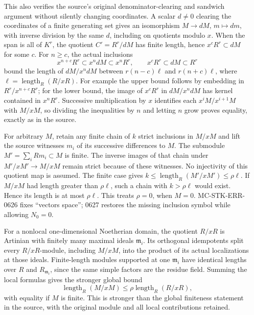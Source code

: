 This also verifies the source's original denominator-clearing and sandwich argument without silently changing coordinates. A scalar \(d\ne0\) clearing the coordinates of a finite generating set gives an isomorphism \(M\to dM\), \(m\mapsto dm\), with inverse division by the same \(d\), including on quotients modulo \(x\). When the span is all of \(K^r\), the quotient \(C'=R^r/dM\) has finite length, hence \(x^cR^r\subset dM\) for some \(c\). For \(n\ge c\), the actual inclusions \[
 x^{n+c}R^r\subset x^n dM\subset x^nR^r,\qquad
 x^cR^r\subset dM\subset R^r
\] bound the length of \(dM/x^ndM\) between \(r(n-c)\ell\) and \(r(n+c)\ell\), where \(\ell=\operatorname{length}_R(R/xR)\). For example the upper bound follows by embedding in \(R^r/x^{n+c}R^r\); for the lower bound, the image of \(x^cR^r\) in \(dM/x^ndM\) has kernel contained in \(x^nR^r\). Successive multiplication by \(x\) identifies each \(x^iM/x^{i+1}M\) with \(M/xM\), so dividing the inequalities by \(n\) and letting \(n\) grow proves equality, exactly as in the source.

For arbitrary \(M\), retain any finite chain of \(k\) strict inclusions in \(M/xM\) and lift the source witnesses \(m_i\) of its successive differences to \(M\). The submodule \(M'=\sum_iRm_i\subset M\) is finite. The inverse images of that chain under \(M'/xM'\to M/xM\) remain strict because of these witnesses. No injectivity of this quotient map is assumed. The finite case gives \(k\le\operatorname{length}_R(M'/xM')\le\rho\ell\). If \(M/xM\) had length greater than \(\rho\ell\), such a chain with \(k>\rho\ell\) would exist. Hence its length is at most \(\rho\ell\). This treats \(\rho=0\), when \(M=0\). MC-\AlgebraIdentifierBreak{}STK-\AlgebraIdentifierBreak{}ERR-\AlgebraIdentifierBreak{}0626 fixes ``vectors space''; 0627 restores the missing inclusion symbol while allowing \(N_0=0\).

For a nonlocal one-dimensional Noetherian domain, the quotient \(R/xR\) is Artinian with finitely many maximal ideals \(\mathfrak m_i\). Its orthogonal idempotents split every \(R/xR\)-module, including \(M/xM\), into the product of its actual localizations at those ideals. Finite-length modules supported at one \(\mathfrak m_i\) have identical lengths over \(R\) and \(R_{\mathfrak m_i}\), since the same simple factors are the residue field. Summing the local formulas gives the stronger global bound \[
 \operatorname{length}_R(M/xM)
 \le \rho\operatorname{length}_R(R/xR),
\] with equality if \(M\) is finite. This is stronger than the global finiteness statement in the source, with the original module and all local contributions retained.

